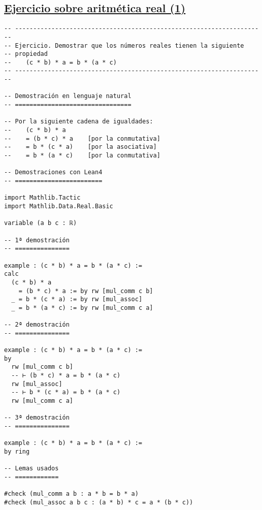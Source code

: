 \subsection{\href{./src/Basicos/Ejercicio\_sobre\_aritmetica\_real\_1.lean}{Ejercicio sobre aritmética real (1)}}
\label{sec:orgbcc70ec}
\begin{verbatim}
-- ---------------------------------------------------------------------
-- Ejercicio. Demostrar que los números reales tienen la siguiente
-- propiedad
--    (c * b) * a = b * (a * c)
-- ---------------------------------------------------------------------

-- Demostración en lenguaje natural
-- ================================

-- Por la siguiente cadena de igualdades:
--    (c * b) * a
--    = (b * c) * a    [por la conmutativa]
--    = b * (c * a)    [por la asociativa]
--    = b * (a * c)    [por la conmutativa]

-- Demostraciones con Lean4
-- ========================

import Mathlib.Tactic
import Mathlib.Data.Real.Basic

variable (a b c : ℝ)

-- 1ª demostración
-- ===============

example : (c * b) * a = b * (a * c) :=
calc
  (c * b) * a
    = (b * c) * a := by rw [mul_comm c b]
  _ = b * (c * a) := by rw [mul_assoc]
  _ = b * (a * c) := by rw [mul_comm c a]

-- 2ª demostración
-- ===============

example : (c * b) * a = b * (a * c) :=
by
  rw [mul_comm c b]
  -- ⊢ (b * c) * a = b * (a * c)
  rw [mul_assoc]
  -- ⊢ b * (c * a) = b * (a * c)
  rw [mul_comm c a]

-- 3ª demostración
-- ===============

example : (c * b) * a = b * (a * c) :=
by ring

-- Lemas usados
-- ============

#check (mul_comm a b : a * b = b * a)
#check (mul_assoc a b c : (a * b) * c = a * (b * c))
\end{verbatim}

